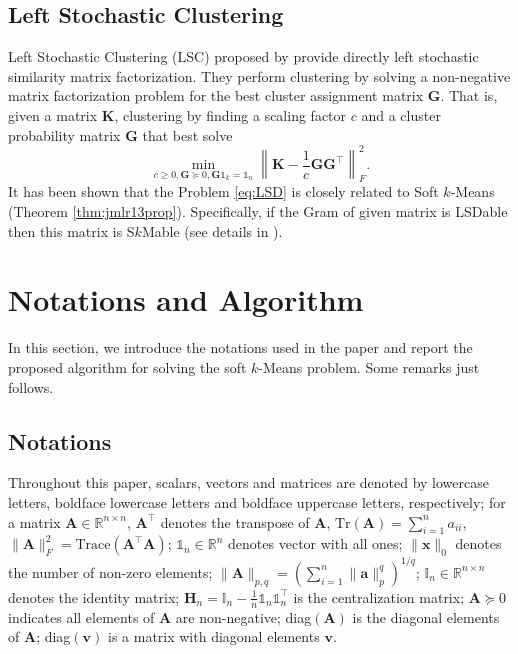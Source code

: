 \documentclass[journal]{IEEEtran}
\begin{document}
\subsection{Left Stochastic Clustering}
Left Stochastic Clustering (LSC) proposed by \cite{arora2013similarity} provide directly left stochastic similarity matrix factorization.
They perform clustering by solving a non-negative matrix factorization problem for the best cluster assignment matrix $\mathbf{G}$. That is, given a matrix $\mathbf{K}$, clustering by finding a scaling factor $c$ and a cluster probability matrix $\mathbf{G}$ that best solve
\begin{equation}\label{eq:LSD}
\min_{c\geq 0, \mathbf{G}\succeq 0,\mathbf{G}\mathbb{1}_k = \mathbb{1}_n} \left\| \mathbf{K} - \frac{1}{c}\mathbf{GG}^\top \right\|_F^2.
\end{equation}
It has been shown that the Problem \eqref{eq:LSD} is closely related to Soft $k$-Means (Theorem \ref{thm:jmlr13prop}).
Specifically, if the Gram of given matrix is LSDable then this matrix is S$k$Mable (see details in ).

\section{Notations and Algorithm} \label{sec:algorithm}
In this section, we introduce the notations used in the paper and report the proposed algorithm for solving the soft $k$-Means problem.
Some remarks just follows.
\subsection{Notations}
Throughout this paper, scalars, vectors and matrices are denoted by lowercase letters, boldface lowercase letters and boldface uppercase letters, respectively; for a matrix $\mathbf{A} \in \mathbb{R}^{n \times n}$, $\mathbf{A}^\top$ denotes the transpose of $\mathbf{A}$, $\text{Tr}(\mathbf{A}) = \sum_{i=1}^n a_{ii}$, $\| \mathbf{A} \|_F^2 = \text{Trace}(\mathbf{A}^\top\mathbf{A})$; $\mathbb{1}_n\in\mathbb{R}^n$ denotes vector with all ones; $\|\mathbf{x}\|_0$ denotes the number of non-zero elements; $\|\mathbf{A}\|_{p,q} = \left( \sum_{i=1}^n \|\mathbf{a}\|_p^q \right)^{1/q}$; $\mathbb{I}_n \in \mathbb{R}^{n\times n}$ denotes the identity matrix; $\mathbf{H}_n = \mathbb{I}_{n} - \frac{1}{n}\mathbb{1}_n\mathbb{1}_n^\top$ is the centralization matrix; $\mathbf{A}\succeq 0$ indicates all elements of $\mathbf{A}$ are non-negative; diag$(\mathbf{A})$ is the 
diagonal elements of $\mathbf{A}$; diag$(\mathbf{v})$ is a matrix with diagonal elements $\mathbf{v}$.
\end{document}
